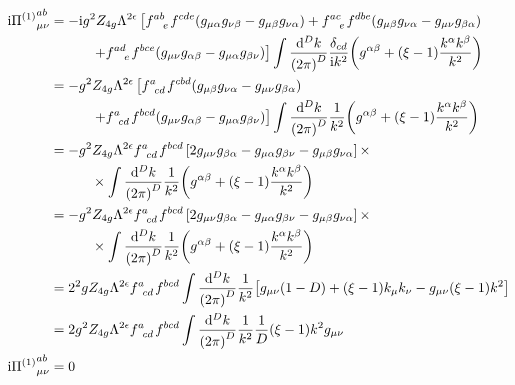 \begin{align}
    \im{\Pi^{\qty(1)}}^{ab}_{\mu\nu}&=-\im g^2Z_{4g}\Lambda^{2\epsilon}\left[
        \tensor{f}{^a^b_e}\tensor{f}{^c^d^e}\qty(g_{\mu\alpha}g_{\nu\beta}-g_{\mu\beta}g_{\nu\alpha})
        +\tensor{f}{^a^c_e}\tensor{f}{^d^b^e}\qty(g_{\mu\beta}g_{\nu\alpha}-g_{\mu\nu}g_{\beta\alpha})\right.\nonumber\\
        &\quad\quad\quad\left.+\tensor{f}{^a^d_e}\tensor{f}{^b^c^e}\qty(g_{\mu\nu}g_{\alpha\beta}-g_{\mu\alpha}g_{\beta\nu})\right]
        \int\frac{\dd[D]{k}}{\qty(2\pi)^{D}}\frac{\delta_{cd}}{\im k^2}\qty(g^{\alpha\beta}+\qty(\xi-1)\frac{k^\alpha k^\beta}{k^2})\nonumber\\
        &=- g^2Z_{4g}\Lambda^{2\epsilon}\left[\tensor{f}{^a_c_d}\tensor{f}{^c^b^d}\qty(g_{\mu\beta}g_{\nu\alpha}-g_{\mu\nu}g_{\beta\alpha})\right.\nonumber\\
        &\quad\quad\quad\left.+\tensor{f}{^a_c_d}\tensor{f}{^b^c^d}\qty(g_{\mu\nu}g_{\alpha\beta}-g_{\mu\alpha}g_{\beta\nu})\right]
        \int\frac{\dd[D]{k}}{\qty(2\pi)^{D}}\frac{1}{ k^2}\qty(g^{\alpha\beta}+\qty(\xi-1)\frac{k^\alpha k^\beta}{k^2})\nonumber\\
        &=- g^2Z_{4g}\Lambda^{2\epsilon}\tensor{f}{^a_c_d}\tensor{f}{^b^c^d}\left[2g_{\mu\nu}g_{\beta\alpha}-g_{\mu\alpha}g_{\beta\nu}-g_{\mu\beta}g_{\nu\alpha}\right]\times\nonumber\\
        &\quad\quad\quad\times\int\frac{\dd[D]{k}}{\qty(2\pi)^{D}}\frac{1}{ k^2}\qty(g^{\alpha\beta}+\qty(\xi-1)\frac{k^\alpha k^\beta}{k^2})\nonumber\\
        &=- g^2Z_{4g}\Lambda^{2\epsilon}\tensor{f}{^a_c_d}\tensor{f}{^b^c^d}\left[2g_{\mu\nu}g_{\beta\alpha}-g_{\mu\alpha}g_{\beta\nu}-g_{\mu\beta}g_{\nu\alpha}\right]\times\nonumber\\
        &\quad\quad\quad\times\int\frac{\dd[D]{k}}{\qty(2\pi)^{D}}\frac{1}{ k^2}\qty(g^{\alpha\beta}+\qty(\xi-1)\frac{k^\alpha k^\beta}{k^2})\nonumber\\
        &=2^2gZ_{4g}\Lambda^{2\epsilon}\tensor{f}{^a_c_d}\tensor{f}{^b^c^d}\int\frac{\dd[D]{k}}{\qty(2\pi)^{D}}\frac{1}{ k^2}
        \qty[g_{\mu\nu}\qty(1-D)+\qty(\xi-1)k_\mu k_\nu-g_{\mu\nu}\qty(\xi-1)k^2]\nonumber\\
        &=2g^2Z_{4g}\Lambda^{2\epsilon}\tensor{f}{^a_c_d}\tensor{f}{^b^c^d}\int\frac{\dd[D]{k}}{\qty(2\pi)^{D}}\frac{1}{ k^2}
        \frac{1}{D}\qty(\xi-1)k^2g_{\mu\nu}\nonumber\\
    \im{\Pi^{\qty(1)}}^{ab}_{\mu\nu}&=0\nonumber
\end{align}

